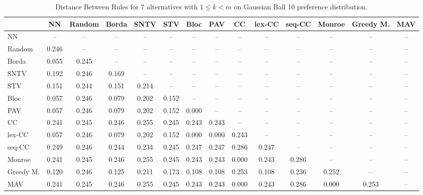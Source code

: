 
\begin{table*}
\centering
\begin{tabular}{lccccccccccccc}
\toprule
 & NN & Random & Borda & SNTV & STV & Bloc & PAV & CC & lex-CC & seq-CC & Monroe & Greedy M. & MAV \\
\midrule
NN & -- & -- & -- & -- & -- & -- & -- & -- & -- & -- & -- & -- & -- \\
Random & 0.246 & -- & -- & -- & -- & -- & -- & -- & -- & -- & -- & -- & -- \\
Borda & 0.055 & 0.245 & -- & -- & -- & -- & -- & -- & -- & -- & -- & -- & -- \\
SNTV & 0.192 & 0.246 & 0.169 & -- & -- & -- & -- & -- & -- & -- & -- & -- & -- \\
STV & 0.151 & 0.244 & 0.151 & 0.214 & -- & -- & -- & -- & -- & -- & -- & -- & -- \\
Bloc & 0.057 & 0.246 & 0.079 & 0.202 & 0.152 & -- & -- & -- & -- & -- & -- & -- & -- \\
PAV & 0.057 & 0.246 & 0.079 & 0.202 & 0.152 & 0.000 & -- & -- & -- & -- & -- & -- & -- \\
CC & 0.241 & 0.245 & 0.246 & 0.255 & 0.245 & 0.243 & 0.243 & -- & -- & -- & -- & -- & -- \\
lex-CC & 0.057 & 0.246 & 0.079 & 0.202 & 0.152 & 0.000 & 0.000 & 0.243 & -- & -- & -- & -- & -- \\
seq-CC & 0.249 & 0.246 & 0.244 & 0.234 & 0.245 & 0.247 & 0.247 & 0.286 & 0.247 & -- & -- & -- & -- \\
Monroe & 0.241 & 0.245 & 0.246 & 0.255 & 0.245 & 0.243 & 0.243 & 0.000 & 0.243 & 0.286 & -- & -- & -- \\
Greedy M. & 0.120 & 0.246 & 0.125 & 0.211 & 0.173 & 0.108 & 0.108 & 0.253 & 0.108 & 0.236 & 0.252 & -- & -- \\
MAV & 0.241 & 0.245 & 0.246 & 0.255 & 0.245 & 0.243 & 0.243 & 0.000 & 0.243 & 0.286 & 0.000 & 0.253 & -- \\
\bottomrule
\end{tabular}

\caption{Distance Between Rules for 7 alternatives with $1 \leq k < m$ on Gaussian Ball 10 preference distribution.}
\end{table*}
